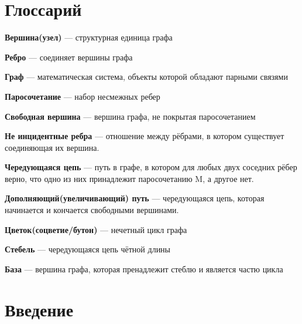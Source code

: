 \documentclass[14pt, a4paper]{extarticle}
\begin{document}
    
    
    \vspace{1cm}
   
    \pagebreak
   
    \tableofcontents
   
    \pagebreak

    \section*{Глоссарий}

    \textbf{Вершина(узел)} --- структурная единица графа

    \textbf{Ребро} --- соединяет вершины графа
    
    \textbf{Граф} --- математическая система, объекты которой обладают парными связями

    \textbf{Паросочетание} --- набор несмежных ребер

    \textbf{Свободная вершина} --- вершина графа, не покрытая паросочетанием

    \textbf{Не инцидентные ребра} --- отношение между рёбрами, в котором существует соединяющая их вершина.

    \textbf{Чередующаяся цепь} --- путь в графе, в котором для любых двух соседних рёбер верно, что одно из них принадлежит паросочетанию M, а другое нет.

    \textbf{Дополняющий(увеличивающий) путь} --- чередующаяся цепь, которая начинается и кончается свободными вершинами.

    \textbf{Цветок(соцветие/бутон)} --- нечетный цикл графа

    \textbf{Стебель} --- чередующаяся цепь чётной длины

    \textbf{База} --- вершина графа, которая пренадлежит стеблю и  является частю цикла

    \pagebreak
   
    \section*{Введение}
   
   
\end{document}

